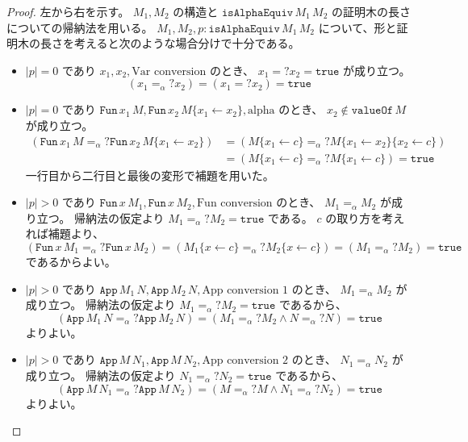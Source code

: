 \documentclass[dvipdfmx]{jsarticle}
\theoremstyle{definition}
\begin{document}
\begin{proof}
  左から右を示す。
  \(M_1 , M_2\) の構造と \(\texttt{isAlphaEquiv} \, M_1 \, M_2\) の証明木の長さについての帰納法を用いる。
  \(M_1 , M_2 , p : \texttt{isAlphaEquiv} \, M_1 \, M_2\) について、形と証明木の長さを考えると次のような場合分けで十分である。
  \begin{itemize}
  \item
    \(|p| = 0\) であり \(x_1 , x_2 , \text{Var conversion}\) のとき、 \(x_1 =? x_2 = \texttt{true}\) が成り立つ。
    \[(x_1 =_{\alpha}? x_2) = (x_1 =? x_2) = \texttt{true}\]
  \item
    \(|p| = 0\) であり \(\texttt{Fun} \, x_1 \, M , \texttt{Fun} \, x_2 \, M\{x_1 \leftarrow x_2\} , \text{alpha}\) のとき、 \(x_2 \notin \texttt{valueOf} \, M\) が成り立つ。
    \begin{align*}
      (\texttt{Fun} \, x_1 \, M =_{\alpha}? \texttt{Fun} \, x_2 \, M\{x_1 \leftarrow x_2\})
      &= (M\{x_1 \leftarrow c\} =_{\alpha}? M\{x_1 \leftarrow x_2\}\{x_2 \leftarrow c\}) \\
      &= (M\{x_1 \leftarrow c\} =_{\alpha}? M\{x_1 \leftarrow c\}) = \texttt{true}
    \end{align*}
      一行目から二行目と最後の変形で補題を用いた。
  \item
    \(|p| > 0\) であり \(\texttt{Fun} \, x \, M_1 , \texttt{Fun} \, x \, M_2 , \text{Fun conversion}\) のとき、 \(M_1 =_{\alpha} M_2\) が成り立つ。
    帰納法の仮定より \(M_1 =_{\alpha}? M_2 = \texttt{true}\) である。
    \(c\) の取り方を考えれば補題より、
    \[(\texttt{Fun} \, x \, M_1 =_{\alpha}? \texttt{Fun} \, x \, M_2) = (M_1\{x \leftarrow c\} =_{\alpha}? M_2\{x \leftarrow c\}) = (M_1 =_{\alpha}? M_2) = \texttt{true}\]
    であるからよい。
  \item
    \(|p| > 0\) であり \(\texttt{App} \, M_1 \, N , \texttt{App} \, M_2 \, N , \text{App conversion 1}\) のとき、 \(M_1 =_{\alpha} M_2\) が成り立つ。
    帰納法の仮定より \(M_1 =_{\alpha}? M_2 = \texttt{true}\) であるから、
    \[(\texttt{App} \, M_1 \, N =_{\alpha}? \texttt{App} \, M_2 \, N) = (M_1 =_{\alpha}? M_2 \wedge N =_{\alpha}? N) = \texttt{true}\] よりよい。
  \item
    \(|p| > 0\) であり \(\texttt{App} \, M \, N_1 , \texttt{App} \, M \, N_2 , \text{App conversion 2}\) のとき、 \(N_1 =_{\alpha} N_2\) が成り立つ。
    帰納法の仮定より \(N_1 =_{\alpha}? N_2 = \texttt{true}\) であるから、
    \[(\texttt{App} \, M \, N_1 =_{\alpha}? \texttt{App} \, M \, N_2) = (M =_{\alpha}? M \wedge N_1 =_{\alpha}? N_2) = \texttt{true}\] よりよい。

\end{itemize}
\end{proof}
\end{document}
